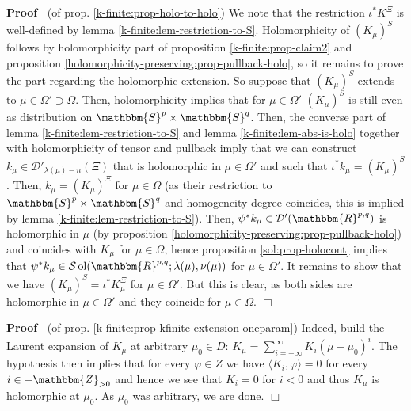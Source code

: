 \documentclass{article}
\newcommand{\tmop}[1]{\ensuremath{\operatorname{#1}}}
\newenvironment{proof}{\noindent\textbf{Proof\ }}{\hspace*{\fill}$\Box$\medskip}
\numberwithin{definition}{section}
\numberwithin{lemma}{section}
\numberwithin{proposition}{section}
{\theorembodyfont{\rmfamily}\newtheorem{remark}{Remark}
\numberwithin{remark}{section}
}
\begin{document}
\begin{proof}
  (of prop. \ref{k-finite:prop-holo-to-holo}) We note that the restriction
  $\iota^{\ast} K^{\Xi}$ is well-defined by lemma
  \ref{k-finite:lem-restriction-to-S}. Holomorphicity of $( K_{\mu})^S$
  follows by holomorphicity part of proposition \ref{k-finite:prop-claim2} and
  proposition \ref{holomorphicity-preserving:prop-pullback-holo}, so it
  remains to prove the part regarding the holomorphic extension. So suppose
  that $( K_{\mu})^S$ extends to $\mu \in \Omega' \supset \Omega$. Then,
  holomorphicity implies that for $\mu \in \Omega'$ $( K_{\mu})^S$ is still
  even as distribution on $\mathbbm{S}^p \times \mathbbm{S}^q$. Then, the
  converse part of lemma \ref{k-finite:lem-restriction-to-S} and lemma
  \ref{k-finite:lem-abs-is-holo} together with holomorphicity of tensor and
  pullback imply that we can construct $k_{\mu} \in \mathcal{D}'_{\lambda (
  \mu) - n} ( \Xi)$ that is holomorphic in $\mu \in \Omega'$ and such that
  $\iota^{\ast} k_{\mu} = ( K_{\mu})^S$. Then, $k_{\mu} = ( K_{\mu})^{\Xi}$
  for $\mu \in \Omega$ (as their restriction to $\mathbbm{S}^p \times
  \mathbbm{S}^q$ and homogeneity degree coincides, this is implied by lemma
  \ref{k-finite:lem-restriction-to-S}). Then, $\psi^{\ast} k_{\mu} \in
  \mathcal{D}' ( \mathbbm{R}^{p, q})$ is holomorphic in $\mu$ (by proposition
  \ref{holomorphicity-preserving:prop-pullback-holo}) and coincides with
  $K_{\mu}$ for $\mu \in \Omega$, hence proposition \ref{sol:prop-holocont}
  implies that $\psi^{\ast} k_{\mu} \in \mathcal{S} \tmop{ol} (
  \mathbbm{R}^{p, q} ; \lambda ( \mu), \nu ( \mu))$ for $\mu \in \Omega'$. It
  remains to show that we have $( K_{\mu})^S = \iota^{\ast} K_{\mu}^{\Xi}$ for
  $\mu \in \Omega'$. But this is clear, as both sides are holomorphic in $\mu
  \in \Omega'$ and they coincide for $\mu \in \Omega$.
\end{proof}

\begin{proof}
  (of prop. \ref{k-finite:prop-kfinite-extension-oneparam}) Indeed, build the
  Laurent expansion of $K_{\mu}$ at arbitrary $\mu_0 \in D$: $K_{\mu} =
  \sum_{i = - \infty}^{\infty} K_i ( \mu - \mu_0)^i$. The hypothesis then
  implies that for every $\varphi \in Z$ we have $\langle K_i, \varphi \rangle
  = 0$ for every $i \in -\mathbbm{Z}_{> 0}$ and hence we see that $K_i = 0$
  for $i < 0$ and thus $K_{\mu}$ is holomorphic at $\mu_0$. As $\mu_0$ was
  arbitrary, we are done.
\end{proof}
\end{document}

